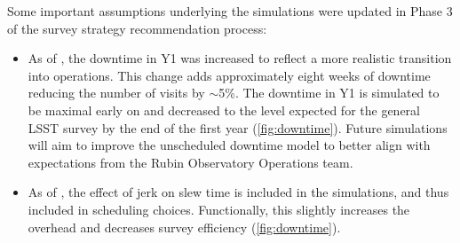 Some important assumptions underlying the simulations were updated in Phase 3 of the survey strategy recommendation process: 

\begin{itemize}
\item As of , the downtime in Y1 was increased to reflect a more realistic transition into operations. This change adds approximately eight weeks of downtime reducing the number of visits by \mbox{$\sim$5\%}. The downtime in Y1 is simulated to be maximal early on and decreased to the level expected for the general LSST survey by the end of the first year (\autoref{fig:downtime}). Future simulations will aim to improve the unscheduled downtime model to better align with expectations from the Rubin Observatory Operations team. 

\item As of , the effect of jerk on slew time is included in the simulations, and thus included in scheduling choices. Functionally, this slightly increases the overhead and decreases survey efficiency (\autoref{fig:downtime}).


\end{itemize}
